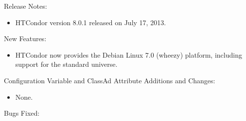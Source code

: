 \noindent Release Notes:

\begin{itemize}

\item HTCondor version 8.0.1 released on July 17, 2013.

\end{itemize}


\noindent New Features:

\begin{itemize}

\item HTCondor now provides the Debian Linux 7.0 (wheezy) platform,
including support for the standard universe.

\end{itemize}

\noindent Configuration Variable and ClassAd Attribute Additions and Changes:

\begin{itemize}

\item None.

\end{itemize}

\noindent Bugs Fixed:

